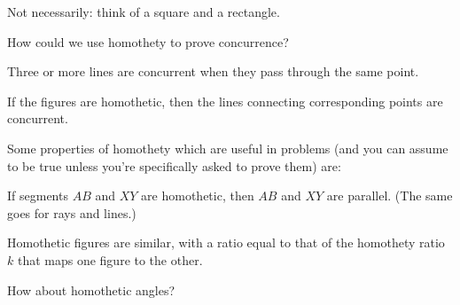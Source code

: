 Not necessarily: think of a square and a rectangle.

How could we use homothety to prove concurrence?



Three or more lines are concurrent when they pass through the same point.



If the figures are homothetic, then the lines connecting corresponding points are concurrent.

Some properties of homothety which are useful in problems (and you can assume to be true unless you're specifically asked to prove them) are:

If segments $AB$ and $XY$ are homothetic, then $AB$ and $XY$ are parallel. (The same goes for rays and lines.)

Homothetic figures are similar, with a ratio equal to that of the homothety ratio $k$ that maps one figure to the other.

How about homothetic angles?






